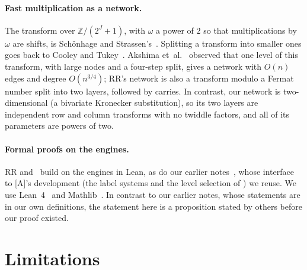 \documentclass[10pt]{amsart}
\theoremstyle{plain}
\theoremstyle{definition}
\theoremstyle{remark}
\numberwithin{equation}{section}
\newcommand{\A}{\textup{[A]}}
\newcommand{\Z}{\mathbb{Z}}
\begin{document}
\paragraph{Fast multiplication as a network.} The transform over $\Z/(2^J+1)$, with $\omega$ a power of
$2$ so that multiplications by $\omega$ are shifts, is Sch\"onhage and Strassen's~\cite{SS71}. Splitting
a transform into smaller ones goes back to Cooley and Tukey~\cite{CT65}. Akshima et~al.~\cite{AK26}
observed that one level of this transform, with large nodes and a four-step split, gives a network with
$O(n)$ edges and degree $O(n^{3/4})$; RR's network is also a transform modulo a Fermat number split into
two layers, followed by carries. In contrast, our network is two-dimensional (a bivariate Kronecker
substitution), so its two layers are independent row and column transforms with no twiddle factors, and
all of its parameters are powers of two.

\paragraph{Formal proofs on the engines.} RR and~\cite{IF26} build on the engines in Lean, as do our
earlier notes~\cite{Tulsyan26}, whose interface to \A's development (the label systems and the level
selection of ) we reuse. We use Lean~4~\cite{Lean4} and Mathlib~\cite{Mathlib20}.
In contrast to our earlier notes, whose statements are in our own definitions, the statement here is a
proposition stated by others before our proof existed.

\section{Limitations}\label{sec:limitations}
\end{document}

